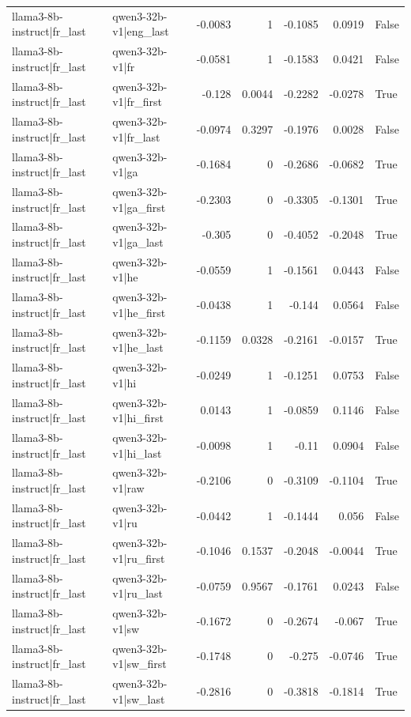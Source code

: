 \begin{table}
\begin{tabular}{l l r r r r l}
llama3-8b-instruct|fr_last & qwen3-32b-v1|eng_last & -0.0083 & 1 & -0.1085 & 0.0919 & False \\
llama3-8b-instruct|fr_last & qwen3-32b-v1|fr & -0.0581 & 1 & -0.1583 & 0.0421 & False \\
llama3-8b-instruct|fr_last & qwen3-32b-v1|fr_first & -0.128 & 0.0044 & -0.2282 & -0.0278 & True \\
llama3-8b-instruct|fr_last & qwen3-32b-v1|fr_last & -0.0974 & 0.3297 & -0.1976 & 0.0028 & False \\
llama3-8b-instruct|fr_last & qwen3-32b-v1|ga & -0.1684 & 0 & -0.2686 & -0.0682 & True \\
llama3-8b-instruct|fr_last & qwen3-32b-v1|ga_first & -0.2303 & 0 & -0.3305 & -0.1301 & True \\
llama3-8b-instruct|fr_last & qwen3-32b-v1|ga_last & -0.305 & 0 & -0.4052 & -0.2048 & True \\
llama3-8b-instruct|fr_last & qwen3-32b-v1|he & -0.0559 & 1 & -0.1561 & 0.0443 & False \\
llama3-8b-instruct|fr_last & qwen3-32b-v1|he_first & -0.0438 & 1 & -0.144 & 0.0564 & False \\
llama3-8b-instruct|fr_last & qwen3-32b-v1|he_last & -0.1159 & 0.0328 & -0.2161 & -0.0157 & True \\
llama3-8b-instruct|fr_last & qwen3-32b-v1|hi & -0.0249 & 1 & -0.1251 & 0.0753 & False \\
llama3-8b-instruct|fr_last & qwen3-32b-v1|hi_first & 0.0143 & 1 & -0.0859 & 0.1146 & False \\
llama3-8b-instruct|fr_last & qwen3-32b-v1|hi_last & -0.0098 & 1 & -0.11 & 0.0904 & False \\
llama3-8b-instruct|fr_last & qwen3-32b-v1|raw & -0.2106 & 0 & -0.3109 & -0.1104 & True \\
llama3-8b-instruct|fr_last & qwen3-32b-v1|ru & -0.0442 & 1 & -0.1444 & 0.056 & False \\
llama3-8b-instruct|fr_last & qwen3-32b-v1|ru_first & -0.1046 & 0.1537 & -0.2048 & -0.0044 & True \\
llama3-8b-instruct|fr_last & qwen3-32b-v1|ru_last & -0.0759 & 0.9567 & -0.1761 & 0.0243 & False \\
llama3-8b-instruct|fr_last & qwen3-32b-v1|sw & -0.1672 & 0 & -0.2674 & -0.067 & True \\
llama3-8b-instruct|fr_last & qwen3-32b-v1|sw_first & -0.1748 & 0 & -0.275 & -0.0746 & True \\
llama3-8b-instruct|fr_last & qwen3-32b-v1|sw_last & -0.2816 & 0 & -0.3818 & -0.1814 & True \\

\end{tabular}
\end{table}

